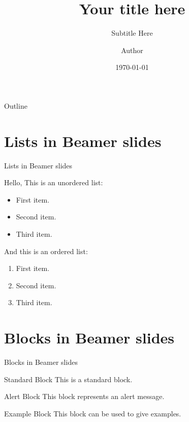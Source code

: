\documentclass{beamer}
\title[Short title]{Your title here}
\subtitle{Subtitle Here}
\institute{Institute}
\author{Author}
\date{\today}
\begin{document}
	
	\begin{frame}
		\titlepage
	\end{frame}
	
	\logo{}	
	\date{}

	\begin{frame}{Outline}
		\tableofcontents
	\end{frame}	
	
	\section{Lists in Beamer slides}
		\begin{frame}{Lists in Beamer slides}
	
			Hello, This is an unordered list:
			\begin{itemize}
				\item First item.
				\item Second item.
				\item Third item.	
			\end{itemize}
		
			And this is an ordered list:
			\begin{enumerate}
				\item First item.
				\item Second item.
				\item Third item.		
			\end{enumerate}
		
		\end{frame}

	\section{Blocks in Beamer slides}
		\begin{frame}{Blocks in Beamer slides}
			\begin{block}{Standard Block}
				This is a standard block.
			\end{block}
		
			\begin{alertblock}{Alert Block}
				This block represents an alert message.
			\end{alertblock}
		
			\begin{exampleblock}{Example Block}
				This block can be used to give examples.
			\end{exampleblock}
		\end{frame}
\end{document}
